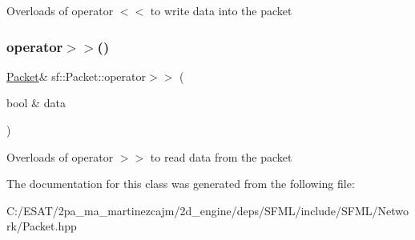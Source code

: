 Overloads of operator $<$$<$ to write data into the packet \mbox{\label{classsf_1_1_packet_af8e26c63ba9bdccd262565ff0d3eeba2}} 
\subsubsection{\texorpdfstring{operator$>$$>$()}{operator>>()}}
{\footnotesize\ttfamily \hyperlink{classsf_1_1_packet}{Packet}\& sf\+::\+Packet\+::operator$>$$>$ (\begin{DoxyParamCaption}\item[{bool \&}]{data }\end{DoxyParamCaption})}

Overloads of operator $>$$>$ to read data from the packet 

The documentation for this class was generated from the following file\+:\begin{DoxyCompactItemize}
\item 
C\+:/\+E\+S\+A\+T/2pa\+\_\+ma\+\_\+martinezcajm/2d\+\_\+engine/deps/\+S\+F\+M\+L/include/\+S\+F\+M\+L/\+Network/Packet.\+hpp\end{DoxyCompactItemize}
